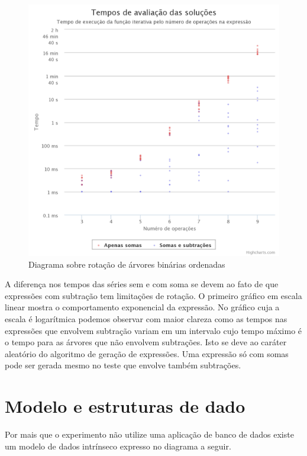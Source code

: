 \begin{figure}[H]
	\caption{\label{gram_cls}Diagrama sobre rotação de árvores binárias ordenadas}
	\begin{center}
	    \includegraphics[scale=0.25]{timming_test_log.png}
	\end{center}
\end{figure}

A diferença nos tempos das séries sem e com soma se devem ao fato de que expressões com subtração tem limitações de rotação. O primeiro gráfico em escala linear mostra o comportamento exponencial da expressão. No gráfico cuja a escala é logarítmica podemos observar com maior clareza como as tempos nas expressões que envolvem subtração variam em um intervalo cujo tempo máximo é o tempo para as árvores que não envolvem subtrações. Isto se deve ao caráter aleatório do algoritmo de geração de expressões. Uma expressão só com somas pode ser gerada mesmo no teste que envolve também subtrações.

\section{Modelo e estruturas de dado}
Por mais que o experimento não utilize uma aplicação de banco de dados existe um modelo de dados intrínseco expresso no diagrama a seguir.

